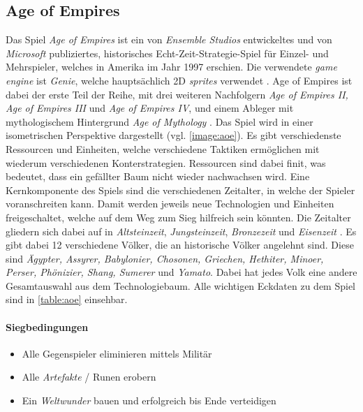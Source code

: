 \subsection{Age of Empires}
Das Spiel \textit{Age of Empires} ist ein von \textit{Ensemble Studios} entwickeltes und von \textit{Microsoft} publiziertes, historisches Echt-Zeit-Strategie-Spiel für Einzel- und Mehrspieler, welches in Amerika im Jahr 1997 erschien. Die verwendete \textit{game engine} ist \textit{Genie}, welche hauptsächlich 2D \textit{sprites} verwendet \cite{aoe}. Age of Empires ist dabei der erste Teil der Reihe, mit drei weiteren Nachfolgern \textit{Age of Empires II, Age of Empires III} und \textit{Age of Empires IV}, und einem Ableger mit mythologischem Hintergrund \textit{Age of Mythology} \cite{aoe2}. Das Spiel wird in einer isometrischen Perspektive dargestellt (vgl. \autoref{image:aoe}). Es gibt verschiedenste Ressourcen und Einheiten, welche verschiedene Taktiken ermöglichen mit wiederum verschiedenen Konterstrategien. Ressourcen sind dabei finit, was bedeutet, dass ein gefällter Baum nicht wieder nachwachsen wird. Eine Kernkomponente des Spiels sind die verschiedenen Zeitalter, in welche der Spieler voranschreiten kann. Damit werden jeweils neue Technologien und Einheiten freigeschaltet, welche auf dem Weg zum Sieg hilfreich sein könnten. Die Zeitalter gliedern sich dabei auf in \textit{Altsteinzeit}, \textit{Jungsteinzeit}, \textit{Bronzezeit} und \textit{Eisenzeit} \cite*[]{aoe}. Es gibt dabei 12 verschiedene Völker, die an historische Völker angelehnt sind. Diese sind \textit{Ägypter, Assyrer, Babylonier, Chosonen, Griechen, Hethiter, Minoer, Perser, Phönizier, Shang, Sumerer} und \textit{Yamato}. Dabei hat jedes Volk eine andere Gesamtauswahl aus dem Technologiebaum. Alle wichtigen Eckdaten zu dem Spiel sind in \autoref{table:aoe} einsehbar.
\paragraph*{Siegbedingungen}
\begin{itemize}
    \item Alle Gegenspieler eliminieren mittels Militär
    \item Alle \textit{Artefakte} / Runen erobern
    \item Ein \textit{Weltwunder} bauen und erfolgreich bis Ende verteidigen
\end{itemize}

